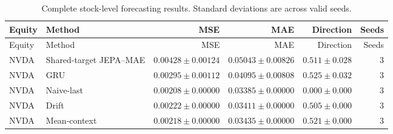 \begin{longtable}{llrrrr}
\caption{Complete stock-level forecasting results. Standard deviations are across valid seeds.}\label{tab:appendix_stock_metrics}\\
\toprule
Equity & Method & MSE & MAE & Direction & Seeds \\
\midrule
\endfirsthead
\toprule
Equity & Method & MSE & MAE & Direction & Seeds \\
\midrule
\endhead
NVDA & Shared-target JEPA--MAE & $0.00428 \pm 0.00124$ & $0.05043 \pm 0.00826$ & $0.511 \pm 0.028$ & 3 \\
NVDA & GRU & $0.00295 \pm 0.00112$ & $0.04095 \pm 0.00808$ & $0.525 \pm 0.032$ & 3 \\
NVDA & Naive-last & $0.00208 \pm 0.00000$ & $0.03385 \pm 0.00000$ & $0.000 \pm 0.000$ & 3 \\
NVDA & Drift & $0.00222 \pm 0.00000$ & $0.03411 \pm 0.00000$ & $0.505 \pm 0.000$ & 3 \\
NVDA & Mean-context & $0.00218 \pm 0.00000$ & $0.03435 \pm 0.00000$ & $0.521 \pm 0.000$ & 3 \\
\bottomrule
\end{longtable}
